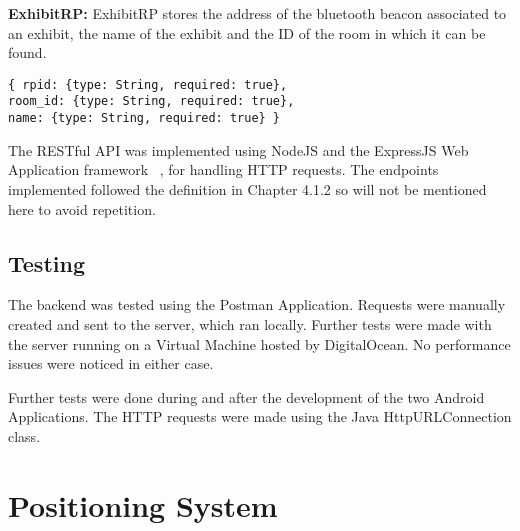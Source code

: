 \noindent
\textbf{ExhibitRP:}
ExhibitRP stores the address of the bluetooth beacon associated to an exhibit, the name of the exhibit and the ID of the room in which it can be found.
\begin{lstlisting}
{ rpid: {type: String, required: true},
room_id: {type: String, required: true},
name: {type: String, required: true} }
\end{lstlisting}

The RESTful API was implemented using NodeJS and the ExpressJS Web Application framework ~\cite{ExpressJS}, for handling HTTP requests. The endpoints implemented followed the definition in Chapter 4.1.2 so will not be mentioned here to avoid repetition.

\subsection{Testing}
The backend was tested using the Postman Application. Requests were manually created and sent to the server, which ran locally. Further tests were made with the server running on a Virtual Machine hosted by DigitalOcean. No performance issues were noticed in either case.

Further tests were done during and after the development of the two Android Applications. The HTTP requests were made using the Java HttpURLConnection class.

\section{Positioning System}

